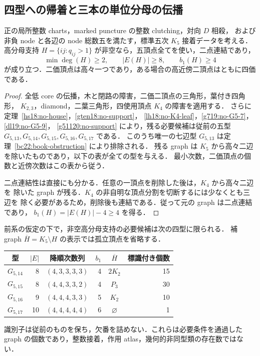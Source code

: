 \subsection{四型への帰着と三本の単位分母の伝播}
\label{sf22:section}\label{sf21:section}\label{sf20:section}

\begin{corollary}[非空支持は少なくとも八本の高辺を持つ]
\label{sf22:no-leaves}\label{sf21:no-leaves}\label{sf20:no-leaves}
正の局所整数 charts，marked puncture の整数 clutching，対向 $D$ 相殺，
および非負 node と各辺の node 総数五を満たす，標準五次 $K_5$ 接着データを考える．
高分母支持 $H=\{ij:q_{ij}>1\}$ が非空なら，五頂点全てを使い，二点連結であり，
\[
 \min\deg(H)\ge2,\qquad |E(H)|\ge8,\qquad b_1(H)\ge4
\]
が成り立つ．二価頂点は高々一つであり，ある場合の高近傍二頂点はともに四価である．
\end{corollary}

\begin{proof}
全低 core の伝播，木と閉路の障害，二価二頂点の三角形，葉付き四角形，
$K_{2,3}$，diamond，二葉三角形，四使用頂点 $K_4$ の障害を適用する．
さらに定理~\ref{hs18:no-house}，\ref{gten18:no-support}，
\ref{lh18:no-K4-leaf}，\ref{g719:no-G5-7}，\ref{dl19:no-G5-9}，
\ref{g51120:no-support} により，残る必要候補は従前の五型
$G_{5,13},G_{5,14},G_{5,15},G_{5,16},G_{5,17}$ である．
このうち唯一の七辺型 $G_{5,13}$ は定理~\ref{bc22:book-obstruction} により排除される．
残る graph は $K_5$ から高々二辺を除いたものであり，以下の表が全ての型を与える．
最小次数，二価頂点の個数と近傍次数はこの表から従う．

二点連結性は直接にも分かる．任意の一頂点を削除した後は，$K_4$ から高々二辺を
除いた graph が残る．$K_4$ の非自明な頂点分割を切断するには少なくとも三辺を
除く必要があるため，削除後も連結である．従って元の graph は二点連結であり，
$b_1(H)=|E(H)|-4\ge4$ を得る．
\end{proof}

\begin{corollary}[四型・五十六標識]
\label{sf22:remaining-support}\label{sf21:remaining-support}\label{sf20:remaining-support}
前系の仮定の下で，非空高分母支持の必要候補は次の四型に限られる．
補 graph $\overline H=K_5\setminus H$ の表示では孤立頂点を省略する．
\begin{center}\small
\begin{tabular}{crcrcr}
型&$|E|$&降順次数列&$b_1$&$\overline H$&標識付き個数\\\hline
$G_{5,14}$&8&$(4,3,3,3,3)$&4&$2K_2$&15\\
$G_{5,15}$&8&$(4,4,3,3,2)$&4&$P_3$&30\\
$G_{5,16}$&9&$(4,4,4,3,3)$&5&$K_2$&10\\
$G_{5,17}$&10&$(4,4,4,4,4)$&6&$\varnothing$&1
\end{tabular}
\end{center}
識別子は従前のものを保ち，欠番を詰めない．これらは必要条件を通過した
graph の個数であり，整数接着，作用 atlas，幾何的非同型類の存在数ではない．
\end{corollary}

